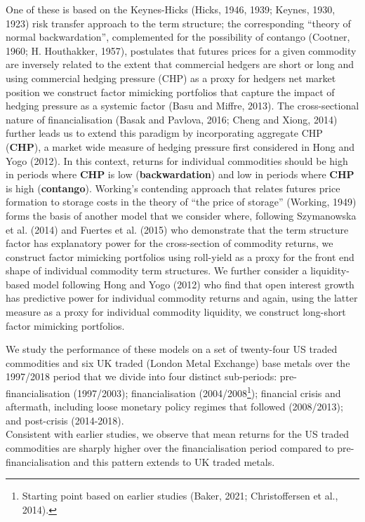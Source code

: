 \documentclass[]{elsarticle} %
\begin{document}
One of these is based on the Keynes-Hicks (Hicks, 1946, 1939; Keynes, 1930, 1923) risk transfer approach to the term structure; the corresponding ``theory of normal backwardation'', complemented for the possibility of contango (Cootner, 1960; H. Houthakker, 1957), postulates that futures prices for a given commodity are inversely related to the extent that commercial hedgers are short or long and using commercial hedging pressure (CHP) as a proxy for hedgers net market position we construct factor mimicking portfolios that capture the impact of hedging pressure as a systemic factor (Basu and Miffre, 2013). The cross-sectional nature of financialisation (Basak and Pavlova, 2016; Cheng and Xiong, 2014) further leads us to extend this paradigm by incorporating aggregate CHP (\textbf{CHP}), a market wide measure of hedging pressure first considered in Hong and Yogo (2012). In this context, returns for individual commodities should be high in periods where \textbf{CHP} is low (\textbf{backwardation}) and low in periods where \textbf{CHP} is high (\textbf{contango}). Working's contending approach that relates futures price formation to storage costs in the theory of ``the price of storage'' (Working, 1949) forms the basis of another model that we consider where, following Szymanowska et al. (2014) and Fuertes et al. (2015) who demonstrate that the term structure factor has explanatory power for the cross-section of commodity returns, we construct factor mimicking portfolios using roll-yield as a proxy for the front end shape of individual commodity term structures. We further consider a liquidity-based model following Hong and Yogo (2012) who find that open interest growth has predictive power for individual commodity returns and again, using the latter measure as a proxy for individual commodity liquidity, we construct long-short factor mimicking portfolios.

\bigskip\bigskip\setlength{\parindent}{0pt}

We study the performance of these models on a set of twenty-four US traded commodities and six UK traded (London Metal Exchange) base metals over the 1997/2018 period that we divide into four distinct sub-periods: pre-financialisation (1997/2003); financialisation (2004/2008\footnote{Starting point based on earlier studies (Baker, 2021; Christoffersen et al., 2014).}); financial crisis and aftermath, including loose monetary policy regimes that followed (2008/2013); and post-crisis (2014-2018).\\
Consistent with earlier studies, we observe that mean returns for the US traded commodities are sharply higher over the financialisation period compared to pre-financialisation and this pattern extends to UK traded metals.
\end{document}
